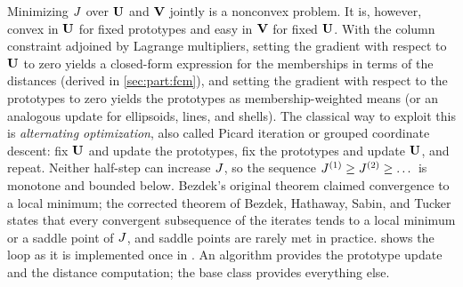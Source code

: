 Minimizing $J$ over $\mathbf{U}$ and $\mathbf{V}$ jointly is a nonconvex problem. It is, however, convex in $\mathbf{U}$ for fixed prototypes and easy in $\mathbf{V}$ for fixed $\mathbf{U}$. With the column constraint adjoined by Lagrange multipliers, setting the gradient with respect to $\mathbf{U}$ to zero yields a closed-form expression for the memberships in terms of the distances (derived in \cref{sec:part:fcm}), and setting the gradient with respect to the prototypes to zero yields the prototypes as membership-weighted means (or an analogous update for ellipsoids, lines, and shells). The classical way to exploit this is \emph{alternating optimization}, also called Picard iteration or grouped coordinate descent: fix $\mathbf{U}$ and update the prototypes, fix the prototypes and update $\mathbf{U}$, and repeat. Neither half-step can increase $J$, so the sequence $J^{(1)}\ge J^{(2)}\ge\dots$ is monotone and bounded below. Bezdek's original theorem \cite{bezdek:1980:convergence} claimed convergence to a local minimum; the corrected theorem of Bezdek, Hathaway, Sabin, and Tucker \cite{bezdek:1987:convergence} states that every convergent subsequence of the iterates tends to a local minimum or a saddle point of $J$, and saddle points are rarely met in practice.  shows the loop as it is implemented once in . An algorithm provides the prototype update and the distance computation; the base class provides everything else.

